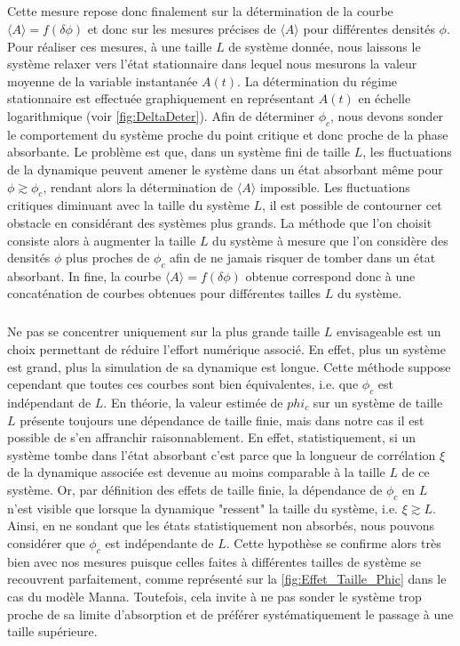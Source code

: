 \subparagraph{}Cette mesure repose donc finalement sur la détermination de la courbe $\langle A \rangle = f(\delta\phi)$ et donc sur les mesures précises de $\langle A \rangle$ pour différentes densités $\phi$. Pour réaliser ces mesures, à une taille $L$ de système donnée, nous laissons le système relaxer vers l'état stationnaire dans lequel nous mesurons la valeur moyenne de la variable instantanée $A(t)$. La détermination du régime stationnaire est effectuée graphiquement en représentant $A(t)$ en échelle logarithmique (voir \autoref{fig:DeltaDeter}). Afin de déterminer $\phi_c$, nous devons sonder le comportement du système proche du point critique et donc proche de la phase absorbante. Le problème est que, dans un système fini de taille $L$, les fluctuations de la dynamique peuvent amener le système dans un état absorbant même pour $\phi \gtrsim \phi_c$, rendant alors la détermination de $\langle A \rangle$ impossible. Les fluctuations critiques diminuant avec la taille du système $L$, il est possible de contourner cet obstacle en considérant des systèmes plus grands. La méthode que l'on choisit consiste alors à augmenter la taille $L$ du système à mesure que l'on considère des densités $\phi$ plus proches de $\phi_c$ afin de ne jamais risquer de tomber dans un état absorbant. In fine, la courbe $\langle A \rangle = f(\delta\phi)$ obtenue correspond donc  à une concaténation de courbes obtenues pour différentes tailles $L$ du système.

\subparagraph{}Ne pas se concentrer uniquement sur la plus grande taille $L$ envisageable est un choix permettant de réduire l'effort numérique associé. En effet, plus un système est grand, plus la simulation de sa dynamique est longue. Cette méthode suppose cependant que toutes ces courbes sont bien équivalentes, i.e. que $\phi_c$ est indépendant de $L$. En théorie, la valeur estimée de $phi_c$ sur un système de taille $L$ présente toujours une dépendance de taille finie, mais dans notre cas il est possible de s'en affranchir raisonnablement. En effet, statistiquement, si un système tombe dans l'état absorbant c'est parce que la longueur de corrélation $\xi$ de la dynamique associée est devenue au moins comparable à la taille $L$ de ce système. Or, par définition des effets de taille finie, la dépendance de $\phi_c$ en $L$ n'est visible que lorsque la dynamique "ressent" la taille du système, i.e. $\xi \gtrsim L$. Ainsi, en ne sondant que les états statistiquement non absorbés, nous pouvons considérer que $\phi_c$ est indépendante de $L$. Cette hypothèse se confirme alors très bien avec nos mesures puisque celles faites à différentes tailles de système se recouvrent parfaitement, comme représenté sur la \autoref{fig:Effet_Taille_Phic} dans le cas du modèle Manna. Toutefois, cela invite à ne pas sonder le système trop proche de sa limite d'absorption et de préférer systématiquement le passage à une taille supérieure.

